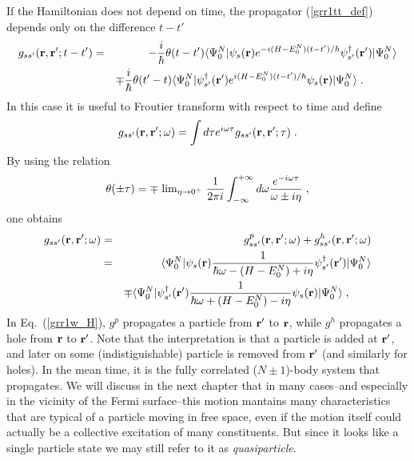If the Hamiltonian does not depend on time, the propagator (\ref{grr1tt_def}) depends only on the difference $t-t'$
\begin{eqnarray}
 g_{s s'}({\bf r}, {\bf r}'; t - t') &=& -\frac{i}{\hbar} \theta(t-t') \langle \Psi^N_0 \vert \psi_s({\bf r}) e^{-i(H - E^N_0)(t-t')/\hbar} \psi^\dag_{s'}({\bf r}')  \vert \Psi^N_0 \rangle 
\nonumber \\
 &&\mp\frac{i}{\hbar} \theta(t'-t) \langle \Psi^N_0 \vert \psi^\dag_{s'}({\bf r}') e^{i(H - E^N_0)(t-t')/\hbar}  \psi_s({\bf r}) \vert \Psi^N_0 \rangle \; . \qquad \quad
\label{grr1dt}
\end{eqnarray}
In this case it is useful to Froutier transform with respect to time and define
\begin{equation}
g_{s s'}({\bf r}, {\bf r}'; \omega) = \int d\tau e^{i\omega\tau} g_{s s'}({\bf r}, {\bf r}'; \tau) \; .
\label{grr1w_FT}
\end{equation}
By using the relation
\begin{equation}
\theta(\pm\tau) = \mp \; \hbox{lim}_{\eta \rightarrow 0^+} ~ \frac{1}{2 \pi i}
                     \int^{+\infty}_{-\infty} d\omega  \frac{e^{-i\omega \tau}}{\omega \pm i \eta} \; ,
\label{thetaFT}
\end{equation}
one obtains
\begin{eqnarray}
g_{s s'}({\bf r}, {\bf r}'; \omega) &=& g^p_{s s'}({\bf r}, {\bf r}'; \omega)
                                       + g^h_{s s'}({\bf r}, {\bf r}'; \omega)
\nonumber \\
 &=& \langle \Psi^N_0 \vert \psi_s({\bf r}) \frac{1}{\hbar\omega - (H - E^N_0) + i\eta} \psi^\dag_{s'}({\bf r}')  \vert \Psi^N_0 \rangle 
\label{grr1w_H} \\
 &&\mp \langle \Psi^N_0 \vert \psi^\dag_{s'}({\bf r}') \frac{1}{\hbar\omega + (H - E^N_0) - i\eta}  \psi_s({\bf r}) \vert \Psi^N_0 \rangle \; ,  \qquad 
\nonumber
\end{eqnarray}
In Eq.~(\ref{grr1w_H}), $g^p$ propagates a particle from ${\bf r}'$ to ${\bf r}$, while $g^h$ propagates a hole from ${\bf r}$ to ${\bf r}'$. Note that the interpretation is that a particle is added at ${\bf r}'$, and later on some (indistiguishable) particle is removed from ${\bf r}'$ (and similarly for holes). In the mean time, it is the fully correlated ($N\pm 1$)-body system that propagates. We will discuss in the next chapter that in many cases--and especially in the vicinity of the Fermi surface--this motion mantains many characteristics that are typical of a particle moving in free space, even if the motion itself could actually be a collective excitation of many constituents. But since it looks like a single particle state we may still refer to it as {\em quasiparticle}.

